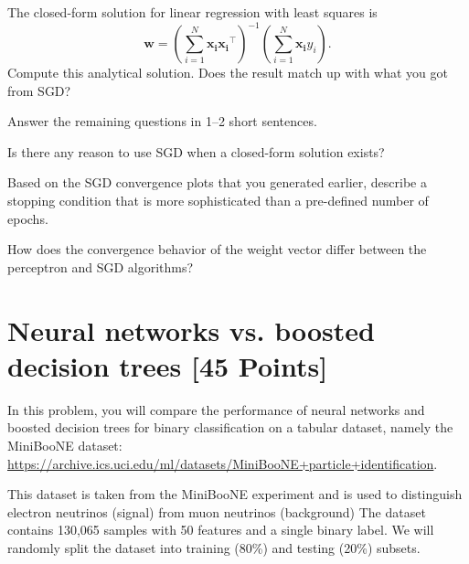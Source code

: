 \begin{problem}[2]
The closed-form solution for linear regression with least squares is \[\mathbf{w} = \left(\sum_{i=1}^N \mathbf{x_i}\mathbf{x_i}^\intercal\right)^{-1}\left(\sum_{i=1}^N \mathbf{x_i}y_i\right).\]
Compute this analytical solution.
Does the result match up with what you got from SGD?
\end{problem}
\begin{solution}

\end{solution}

Answer the remaining questions in 1--2 short sentences.

\begin{problem}[2]
Is there any reason to use SGD when a closed-form solution exists?
\end{problem}
\begin{solution}

\end{solution}

\begin{problem}[2]
Based on the SGD convergence plots that you generated earlier, describe a stopping condition that is more sophisticated than a pre-defined number of epochs.
\end{problem}
\begin{solution}

\end{solution}

\begin{problem}[2]
How does the convergence behavior of the weight vector differ between the perceptron and SGD algorithms?
\end{problem}
\begin{solution}
\end{solution}


\section{Neural networks vs. boosted decision trees [45 Points]}

In this problem, you will compare the performance of neural networks and boosted decision trees for binary classification on a tabular dataset, namely the MiniBooNE dataset: \url{https://archive.ics.uci.edu/ml/datasets/MiniBooNE+particle+identification}.

This dataset is taken from the MiniBooNE experiment and is used to distinguish electron neutrinos (signal) from muon neutrinos (background)
The dataset contains 130,065 samples with 50 features and a single binary label.
We will randomly split the dataset into training (80\%) and testing (20\%) subsets.

